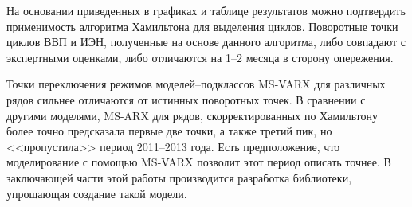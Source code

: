 \documentclass[a4paper,14pt]{extreport}
\begin{document}
	На основании приведенных в графиках и таблице результатов можно подтвердить применимость алгоритма Хамильтона для выделения циклов. Поворотные точки циклов ВВП и ИЭН, полученные на основе данного алгоритма, либо совпадают с экспертными оценками, либо отличаются на 1--2 месяца в сторону опережения.
	
	Точки переключения режимов моделей--подклассов MS-VARX для различных рядов сильнее отличаются от истинных поворотных точек. В сравнении с другими моделями, MS-ARX для рядов, скорректированных по Хамильтону более точно предсказала первые две точки, а также третий пик, но <<пропустила>> период 2011--2013 года. Есть предположение, что моделирование с помощью MS-VARX позволит этот период описать точнее. В заключающей части этой работы производится разработка библиотеки, упрощающая создание такой модели.
	
	
	
\end{document}
